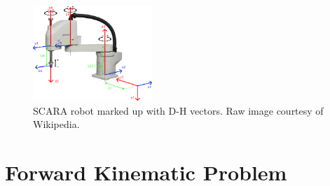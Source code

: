 \documentclass[conference]{IEEEtran}
\begin{document}
\begin{figure}[htbp]
    \centerline{\includegraphics[width=0.4\textwidth]{figures/SCARA.png}}
    \caption{SCARA robot marked up with D-H vectors. Raw image courtesy of Wikipedia\cite{b3}.}
    \label{fig:scara}
\end{figure}

\section{Forward Kinematic Problem}
\end{document}
